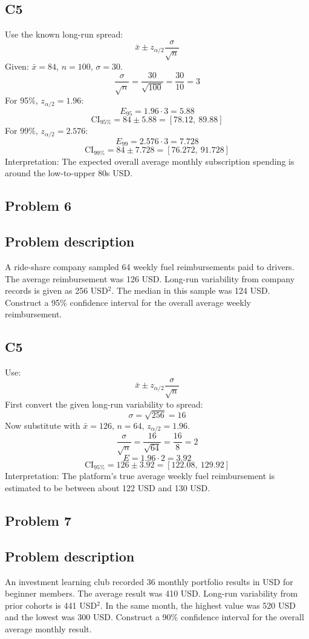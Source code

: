 \begin{ExamProblems}
		\subsection*{C5}
		Use the known long-run spread:
		\[
		\bar{x} \pm z_{\alpha/2}\frac{\sigma}{\sqrt{n}}
		\]
		Given: $\bar{x}=84$, $n=100$, $\sigma=30$.
		\[
		\frac{\sigma}{\sqrt{n}}=\frac{30}{\sqrt{100}}=\frac{30}{10}=3
		\]
		For 95\%, $z_{\alpha/2}=1.96$:
		\[
		E_{95}=1.96\cdot 3=5.88
		\]
		\[
		\text{CI}_{95\%}=84\pm 5.88=[78.12,\ 89.88]
		\]
		For 99\%, $z_{\alpha/2}=2.576$:
		\[
		E_{99}=2.576\cdot 3=7.728
		\]
		\[
		\text{CI}_{99\%}=84\pm 7.728=[76.272,\ 91.728]
		\]
		Interpretation: The expected overall average monthly subscription spending is around the low-to-upper 80s USD.

		\newpage
		\item
		\subsection*{Problem 6}
		\subsection*{Problem description}
		A ride-share company sampled 64 weekly fuel reimbursements paid to drivers.
		The average reimbursement was 126 USD.
		Long-run variability from company records is given as 256 USD$^2$.
		The median in this sample was 124 USD.
		Construct a 95\% confidence interval for the overall average weekly reimbursement.

		\subsection*{C5}
		Use:
		\[
		\bar{x} \pm z_{\alpha/2}\frac{\sigma}{\sqrt{n}}
		\]
		First convert the given long-run variability to spread:
		\[
		\sigma=\sqrt{256}=16
		\]
		Now substitute with $\bar{x}=126$, $n=64$, $z_{\alpha/2}=1.96$.
		\[
		\frac{\sigma}{\sqrt{n}}=\frac{16}{\sqrt{64}}=\frac{16}{8}=2
		\]
		\[
		E=1.96\cdot 2=3.92
		\]
		\[
		\text{CI}_{95\%}=126\pm 3.92=[122.08,\ 129.92]
		\]
		Interpretation: The platform's true average weekly fuel reimbursement is estimated to be between about 122 USD and 130 USD.

		\newpage
		\item
		\subsection*{Problem 7}
		\subsection*{Problem description}
		An investment learning club recorded 36 monthly portfolio results in USD for beginner members.
		The average result was 410 USD.
		Long-run variability from prior cohorts is 441 USD$^2$.
		In the same month, the highest value was 520 USD and the lowest was 300 USD.
		Construct a 90\% confidence interval for the overall average monthly result.


\end{ExamProblems}
